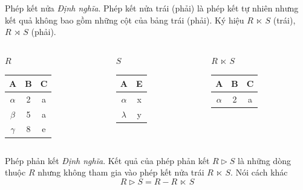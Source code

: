 \documentclass[11pt, handout]{beamer}
\begin{document}
  \begin{frame}{Phép kết nửa}
    \textit{Định nghĩa}. Phép kết nửa trái (phải) là phép kết tự nhiên nhưng kết quả không bao gồm
    những cột của bảng trái (phải). Ký hiệu $R~⋉~S$ (trái), $R~⋊~S$ (phải).
  \end{frame}
  \begin{frame}
    \begin{columns}[T]
      \begin{column}{0.3\textwidth}
        \centering $R$
        \medskip \\
        \begin{tabular}{|c|c|c|}
          \hline
          \textbf{A} & \textbf{B} & \textbf{C}  \\[0.5ex] \hline\hline
          $\alpha$ & 2 & a\\ \hline
          $\beta$ & 5 & a\\ \hline
          $\gamma$ & 8 & e\\ \hline
        \end{tabular}
      \end{column}
      \begin{column}{0.3\textwidth}
        \centering $S$
        \medskip \\
        \begin{tabular}{|c|c|}
          \hline
          \textbf{A} & \textbf{E} \\[0.5ex] \hline\hline
          $\alpha$ & x\\ \hline
          $\lambda$ & y\\ \hline
        \end{tabular}
      \end{column}
      \begin{column}{0.3\textwidth}
        \centering $R~⋉~S$
        \medskip \\
        \begin{tabular}{|c|c|c|}
          \hline
          \textbf{A} & \textbf{B} & \textbf{C}\\[0.5ex] \hline\hline
          $\alpha$ & 2 & a \\ \hline
        \end{tabular}
      \end{column}
    \end{columns}
  \end{frame}
  \begin{frame}{Phép phản kết}
    \textit{Định nghĩa}. Kết quả của phép phản kết $R \rhd S$ là những dòng thuộc $R$ nhưng không tham gia
    vào phép kết nửa trái $R~⋉~S$. Nói cách khác
    $$
    R \rhd S = R - R~⋉~S
    $$
  \end{frame}
\end{document}
